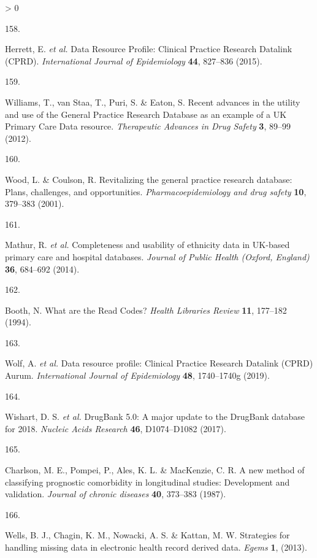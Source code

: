 \documentclass[a4paper, twoside]{templates/ociamthesis}
\newlength{\cslhangindent}
\newlength{\csllabelwidth}
\newenvironment{CSLReferences}[3] %
 {%
  \setlength{\parindent}{0pt}
  \ifodd #1 \everypar{\setlength{\hangindent}{\cslhangindent}}\ignorespaces\fi
  \ifnum #2 > 0
  \setlength{\parskip}{#2\baselineskip}
  \fi
 }%
 {}
\newcommand{\CSLLeftMargin}[1]{\parbox[t]{\maxof{\widthof{#1}}{\csllabelwidth}}{#1}}
\newcommand{\CSLRightInline}[1]{\parbox[t]{\linewidth - \csllabelwidth}{#1}}
\begin{document}
\begin{CSLReferences}{0}{0}
\leavevmode\hypertarget{ref-herrett2015}{}%
\CSLLeftMargin{158. }
\CSLRightInline{Herrett, E. \emph{et al.} Data {Resource Profile}: {Clinical Practice Research Datalink} ({CPRD}). \emph{International Journal of Epidemiology} \textbf{44}, 827--836 (2015).}

\leavevmode\hypertarget{ref-williams2012}{}%
\CSLLeftMargin{159. }
\CSLRightInline{Williams, T., van Staa, T., Puri, S. \& Eaton, S. Recent advances in the utility and use of the {General Practice Research Database} as an example of a {UK Primary Care Data} resource. \emph{Therapeutic Advances in Drug Safety} \textbf{3}, 89--99 (2012).}

\leavevmode\hypertarget{ref-wood2001revitalizing}{}%
\CSLLeftMargin{160. }
\CSLRightInline{Wood, L. \& Coulson, R. Revitalizing the general practice research database: Plans, challenges, and opportunities. \emph{Pharmacoepidemiology and drug safety} \textbf{10}, 379--383 (2001).}

\leavevmode\hypertarget{ref-mathur2014}{}%
\CSLLeftMargin{161. }
\CSLRightInline{Mathur, R. \emph{et al.} Completeness and usability of ethnicity data in {UK}-based primary care and hospital databases. \emph{Journal of Public Health (Oxford, England)} \textbf{36}, 684--692 (2014).}

\leavevmode\hypertarget{ref-booth1994}{}%
\CSLLeftMargin{162. }
\CSLRightInline{Booth, N. What are the {Read Codes}? \emph{Health Libraries Review} \textbf{11}, 177--182 (1994).}

\leavevmode\hypertarget{ref-wolf2019}{}%
\CSLLeftMargin{163. }
\CSLRightInline{Wolf, A. \emph{et al.} Data resource profile: {Clinical Practice Research Datalink} ({CPRD}) {Aurum}. \emph{International Journal of Epidemiology} \textbf{48}, 1740--1740g (2019).}

\leavevmode\hypertarget{ref-wishart2017}{}%
\CSLLeftMargin{164. }
\CSLRightInline{Wishart, D. S. \emph{et al.} {DrugBank} 5.0: A major update to the {DrugBank} database for 2018. \emph{Nucleic Acids Research} \textbf{46}, D1074--D1082 (2017).}

\leavevmode\hypertarget{ref-charlson1987new}{}%
\CSLLeftMargin{165. }
\CSLRightInline{Charlson, M. E., Pompei, P., Ales, K. L. \& MacKenzie, C. R. A new method of classifying prognostic comorbidity in longitudinal studies: Development and validation. \emph{Journal of chronic diseases} \textbf{40}, 373--383 (1987).}

\leavevmode\hypertarget{ref-wells2013strategies}{}%
\CSLLeftMargin{166. }
\CSLRightInline{Wells, B. J., Chagin, K. M., Nowacki, A. S. \& Kattan, M. W. Strategies for handling missing data in electronic health record derived data. \emph{Egems} \textbf{1}, (2013).}


\end{CSLReferences}
\end{document}
